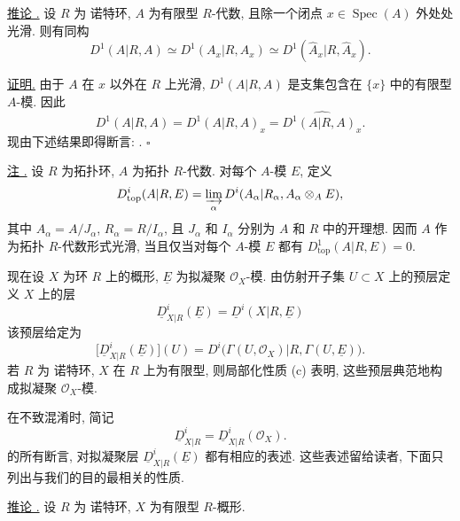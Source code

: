 

\underline{推论 .}
设 $R$ 为 诺特环, $A$ 为有限型 $R$-代数, 且除一个闭点 $x\in\operatorname{Spec}(A)$ 外处处光滑. 则有同构
\[
 D^1(A|R,A)\simeq D^1(A_x|R,A_x)
 \simeq D^1(\widehat A_x|R,\widehat A_x).
\]

\underline{证明.}
由于 $A$ 在 $x$ 以外在 $R$ 上光滑, $D^1(A|R,A)$ 是支集包含在 $\{x\}$ 中的有限型 $A$-模. 因此
\[
 D^1(A|R,A)=D^1(A|R,A)_x
 =\widehat{D^1(A|R,A)_x}.
\]
现由下述结果即得断言: .
\hfill$\square$

\underline{注 .}
设 $R$ 为拓扑环, $A$ 为拓扑 $R$-代数. 对每个 $A$-模 $E$, 定义
\[
 D^i_{\mathrm{top}}(A|R,E)
 =\varinjlim_\alpha
 D^i(A_\alpha|R_\alpha,A_\alpha\otimes_AE),
\]
其中 $A_\alpha=A/J_\alpha$, $R_\alpha=R/I_\alpha$, 且 $J_\alpha$ 和 $I_\alpha$ 分别为 $A$ 和 $R$ 中的开理想. 因而 $A$ 作为拓扑 $R$-代数形式光滑, 当且仅当对每个 $A$-模 $E$ 都有 $D^1_{\mathrm{top}}(A|R,E)=0$.

现在设 $X$ 为环 $R$ 上的概形, $\underline E$ 为拟凝聚 $\mathcal O_X$-模. 由仿射开子集 $U\subset X$ 上的预层定义 $X$ 上的层
\[
 \underline D^i_{X|R}(\underline E)
 =\underline D^i(X|R,\underline E)
\]
该预层给定为
\[
 \bigl[\underline D^i_{X|R}(\underline E)\bigr](U)
 =D^i\bigl(\Gamma(U,\mathcal O_X)|R,
            \Gamma(U,\underline E)\bigr).
\]
若 $R$ 为 诺特环, $X$ 在 $R$ 上为有限型, 则局部化性质 (c) 表明, 这些预层典范地构成拟凝聚 $\mathcal O_X$-模.

在不致混淆时, 简记
\[
 \underline D^i_{X|R}
 =\underline D^i_{X|R}(\mathcal O_X).
\]
 的所有断言, 对拟凝聚层 $\underline D^i_{X|R}(\underline E)$ 都有相应的表述. 这些表述留给读者, 下面只列出与我们的目的最相关的性质.

\underline{推论 .}
设 $R$ 为 诺特环, $X$ 为有限型 $R$-概形.


